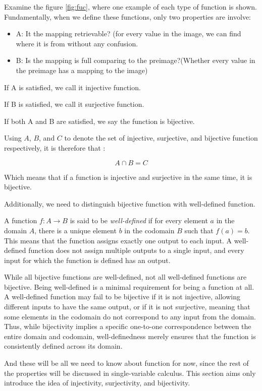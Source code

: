 Examine the figure \autoref{fig:fuc}, where one example of each type of function is shown. Fundamentally, when we define these functions, only two properties are involve:
\begin{itemize}
    \item A: It the mapping retrievable? (for every value in the image, we can find where it is from without any confusion.
    \item B: Is the mapping is full comparing to the preimage?(Whether every value in the preimage has a mapping to the image)
\end{itemize}
If A is satisfied, we call it injective function.

If B is satisfied, we call it surjective function.

If both A and B are satisfied, we say the function is bijective.

Using $A$, $B$, and $C$ to denote the set of injective, surjective, and bijective function respectively, it is therefore that :

    $$A\cap B = C$$

Which means that if a function is injective and surjective in the same time, it is bijective. 

Additionally, we need to distinguish bijective function with well-defined function.
\begin{definition}
	A function \( f: A \rightarrow B \) is said to be \emph{well-defined} if for every element \( a \) 
	in the domain \( A \), there is a unique element \( b \) in the codomain \( B \) such that \( f(a) = b \). 
	This means that the function assigns exactly one output to each input. A well-defined function does not 
	assign multiple outputs to a single input, and every input for which the function is defined has an 
	output.
\end{definition}
\begin{remark}
	While all bijective functions are well-defined, not all well-defined functions are bijective. 
	Being well-defined is a minimal requirement for being a function at all. A well-defined function may 
	fail to be bijective if it is not injective, allowing different inputs to have the same output, or if 
	it is not surjective, meaning that some elements in the codomain do not correspond to any input from 
	the domain. Thus, while bijectivity implies a specific one-to-one correspondence between the entire 
	domain and codomain, well-definedness merely ensures that the function is consistently defined across 
	its domain.
\end{remark}
And these will be all we need to know about function for now, since the rest of the properties will be discussed in single-variable calculus. This section aims only introduce the idea of injectivity, surjectivity, and bijectivity.

